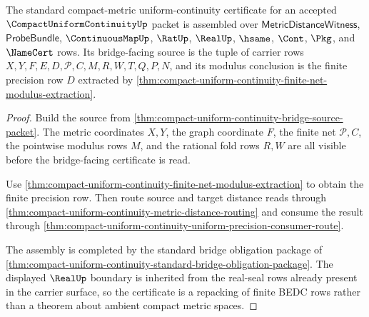 \begin{theorem}
\label{thm:compact-uniform-continuity-bridge-modulus-assembly}
The standard compact-metric uniform-continuity certificate for an accepted $\CompactUniformContinuityUp$ packet is assembled over $\mathsf{MetricDistanceWitness}$, $\mathsf{ProbeBundle}$, $\ContinuousMapUp$, $\RatUp$, $\RealUp$, $\hsame$, $\Cont$, $\Pkg$, and $\NameCert$ rows. Its bridge-facing source is the tuple of carrier rows $X,Y,F,E,D,\mathcal{P},C,M,R,W,T,Q,P,N$, and its modulus conclusion is the finite precision row $D$ extracted by \autoref{thm:compact-uniform-continuity-finite-net-modulus-extraction}.
\end{theorem}
\begin{proof}
Build the source from \autoref{thm:compact-uniform-continuity-bridge-source-packet}. The metric coordinates $X,Y$, the graph coordinate $F$, the finite net $\mathcal{P},C$, the pointwise modulus rows $M$, and the rational fold rows $R,W$ are all visible before the bridge-facing certificate is read.

Use \autoref{thm:compact-uniform-continuity-finite-net-modulus-extraction} to obtain the finite precision row. Then route source and target distance reads through \autoref{thm:compact-uniform-continuity-metric-distance-routing} and consume the result through \autoref{thm:compact-uniform-continuity-uniform-precision-consumer-route}.

The assembly is completed by the standard bridge obligation package of \autoref{thm:compact-uniform-continuity-standard-bridge-obligation-package}. The displayed $\RealUp$ boundary is inherited from the real-seal rows already present in the carrier surface, so the certificate is a repacking of finite BEDC rows rather than a theorem about ambient compact metric spaces.
\end{proof}


